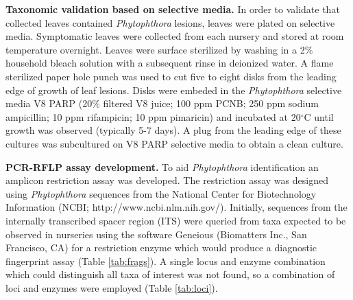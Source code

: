 \documentclass[12pt]{article}
\begin{document}
\textbf{Taxonomic validation based on selective media.} In order to validate that collected leaves contained \emph{Phytophthora} lesions, leaves were plated on selective media.  Symptomatic leaves were collected from each nursery and stored at room temperature overnight.  Leaves were surface sterilized by washing in a 2\% household bleach solution with a subsequent rinse in deionized water.  A flame sterilized paper hole punch was used to cut five to eight disks from the leading edge of growth of leaf lesions.  Disks were embeded in the \emph{Phytophthora} selective media V8 PARP (20\% filtered V8 juice; 100 ppm PCNB; 250 ppm sodium ampicillin; 10 ppm rifampicin; 10 ppm pimaricin)\cite{jeffers_martin_1986} and incubated at 20$^\circ$C until growth was observed (typically 5-7 days).  A plug from the leading edge of these cultures was subcultured on V8 PARP selective media to obtain a clean culture.

\textbf{PCR-RFLP assay development.}  To aid \emph{Phytophthora} identification an amplicon restriction assay was developed.  The restriction assay was designed using \emph{Phytophthora} sequences from the National Center for Biotechnology Information (NCBI; http://www.ncbi.nlm.nih.gov/).  Initially, sequences from the internally transcribed spacer region (ITS) were queried from taxa expected to be observed in nurseries using the software Geneious (Biomatters Inc., San Francisco, CA) for a restriction enzyme which would produce a diagnostic fingerprint assay (Table \ref{tab:frags}).  A single locus and enzyme combination which could distinguish all taxa of interest was not found, so a combination of loci and enzymes were employed (Table \ref{tab:loci}).
\end{document}
